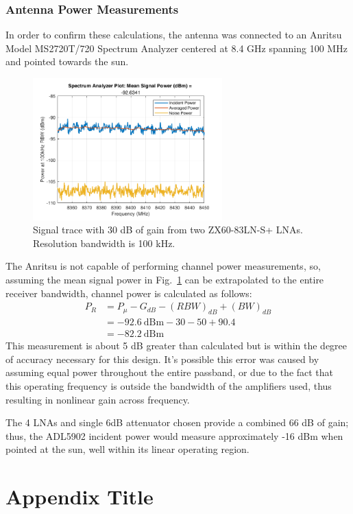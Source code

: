 \documentclass[titlepage]{article}
\begin{document}
\subsubsection{Antenna Power Measurements}
In order to confirm these calculations, the antenna was connected to an Anritsu Model MS2720T/720 Spectrum Analyzer centered at 8.4 GHz spanning 100 MHz and pointed towards the sun.
\begin{figure}[H]%
\begin {center}
\includegraphics[width=0.65\textwidth]{images/specan1.png}
\caption{Signal trace with 30 dB of gain from two ZX60-83LN-S+ LNAs. Resolution bandwidth is 100 kHz.}
\label{fig:specan1}
\end {center}
\end{figure}
The Anritsu is not capable of performing channel power measurements, so, assuming the mean signal power in Fig.~\ref{fig:specan1} can be extrapolated to the entire receiver bandwidth, channel power is calculated as follows:
\begin{align*}
    P_R &= P_{\mu} - G_{dB} - \left(RBW\right)_{dB} + \left(BW\right)_{dB}\\
        &= -92.6\ \text{dBm} - 30 - 50 + 90.4\\
        &= -82.2\ \text{dBm}
\end{align*}
This measurement is about 5 dB greater than calculated but is within the degree of accuracy necessary for this design. It's possible this error was caused by assuming equal power throughout the entire passband, or due to the fact that this operating frequency is outside the bandwidth of the amplifiers used, thus resulting in nonlinear gain across frequency.

The 4 LNAs and single 6dB attenuator chosen provide a combined 66 dB of gain; thus, the ADL5902 incident power would measure approximately -16 dBm when pointed at the sun, well within its linear operating region.


\appendix
\section{Appendix Title}
\end{document}
